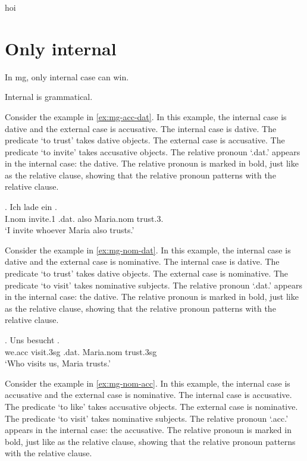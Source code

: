 hoi

\section{Only internal}

In \ac{mg}, only internal case can win.

Internal is grammatical.

Consider the example in \ref{ex:mg-acc-dat}. In this example, the internal case is dative and the external case is accusative.
The internal case is dative. The predicate  `to trust' takes dative objects.
The external case is accusative. The predicate  `to invite' takes accusative objects.
The relative pronoun  `.\ac{dat}.' appears in the internal case: the dative. The relative pronoun is marked in bold, just like as the relative clause, showing that the relative pronoun patterns with the relative clause.

\exg. Ich {lade ein}    . \\
I.\ac{nom} invite.1\scsub{[acc]} .\ac{dat}. also Maria.\ac{nom} trust.3\scsub{[dat]}.\\
`I invite whoever Maria also trusts.' \label{ex:mg-acc-dat}

Consider the example in \ref{ex:mg-nom-dat}. In this example, the internal case is dative and the external case is nominative.
The internal case is dative. The predicate  `to trust' takes dative objects.
The external case is nominative. The predicate  `to visit' takes nominative subjects.
The relative pronoun  `.\ac{dat}.' appears in the internal case: the dative. The relative pronoun is marked in bold, just like as the relative clause, showing that the relative pronoun patterns with the relative clause.

\exg. Uns besucht   .\\
we.\ac{acc} visit.3\ac{sg}\scsub{[nom]} .\ac{dat}. Maria.\ac{nom} trust.3\ac{sg}\scsub{[dat]}\\
`Who visits us, Maria trusts.' \label{ex:mg-nom-dat}

Consider the example in \ref{ex:mg-nom-acc}. In this example, the internal case is accusative and the external case is nominative.
The internal case is accusative. The predicate  `to like' takes accusative objects.
The external case is nominative. The predicate  `to visit' takes nominative subjects.
The relative pronoun  `.\ac{acc}.' appears in the internal case: the accusative. The relative pronoun is marked in bold, just like as the relative clause, showing that the relative pronoun patterns with the relative clause.

